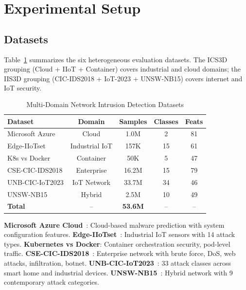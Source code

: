 \documentclass[10pt,journal,compsoc]{IEEEtran}
\begin{document}
\vspace{-0.2cm}
\section{Experimental Setup}
\label{sec:experiments}

\vspace{-0.2cm}
\subsection{Datasets}

Table~\ref{tab:datasets} summarizes the six heterogeneous evaluation datasets. The ICS3D grouping (Cloud + IIoT + Container) covers industrial and cloud domains; the IIS3D grouping (CIC-IDS2018 + IoT-2023 + UNSW-NB15) covers internet and IoT security.

\begin{table}[!t]
\centering
\caption{Multi-Domain Network Intrusion Detection Datasets}
\label{tab:datasets}
\small
\begin{tabular}{@{}lcccc@{}}
\toprule
\textbf{Dataset} & \textbf{Domain} & \textbf{Samples} & \textbf{Classes} & \textbf{Feats} \\
\midrule
Microsoft Azure & Cloud & 1.0M & 2 & 81 \\
Edge-IIoTset & Industrial IoT & 157K & 15 & 61 \\
K8s vs Docker & Container & 50K & 5 & 47 \\
CSE-CIC-IDS2018 & Enterprise & 16.2M & 15 & 79 \\
UNB-CIC-IoT2023 & IoT Network & 33.7M & 34 & 46 \\
UNSW-NB15 & Hybrid & 2.5M & 10 & 49 \\
\midrule
\textbf{Total} & -- & \textbf{53.6M} & -- & -- \\
\bottomrule
\end{tabular}
\end{table}

\textbf{Microsoft Azure Cloud}~\cite{microsoft2019malware}: Cloud-based malware prediction with system configuration features. \textbf{Edge-IIoTset}~\cite{ferrag2022edge}: Industrial IoT sensors with 14 attack types. \textbf{Kubernetes vs Docker}: Container orchestration security, pod-level traffic. \textbf{CSE-CIC-IDS2018}~\cite{sharafaldin2018toward}: Enterprise network with brute force, DoS, web attacks, infiltration, botnet. \textbf{UNB-CIC-IoT2023}~\cite{neto2023ciciot2023}: 33 attack classes across smart home and industrial devices. \textbf{UNSW-NB15}~\cite{moustafa2015unsw}: Hybrid network with 9 contemporary attack categories.
\end{document}
